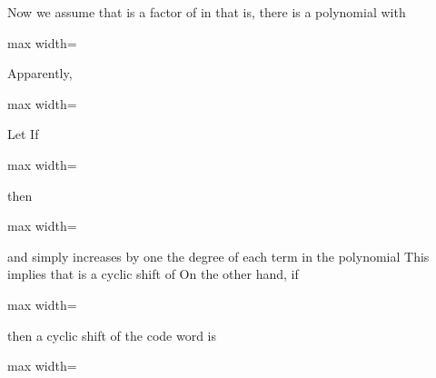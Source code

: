\documentclass[11pt,oneside]{article}
\begin{document}
\begin{BookBody}
Now we assume that  is a factor of  in  that is, there is a polynomial  with

\begin{center}\begin{adjustbox}{max width=\linewidth}\end{adjustbox}\end{center}

\noindent Apparently,

\begin{center}\begin{adjustbox}{max width=\linewidth}\end{adjustbox}\end{center}

\noindent Let  If

\begin{center}\begin{adjustbox}{max width=\linewidth}\end{adjustbox}\end{center}

\noindent then

\begin{center}\begin{adjustbox}{max width=\linewidth}\end{adjustbox}\end{center}

\noindent and  simply increases by one the degree of each term in the polynomial  This implies that  is a cyclic shift of  On the other hand, if

\begin{center}\begin{adjustbox}{max width=\linewidth}\end{adjustbox}\end{center}

\noindent then a cyclic shift of the code word  is

\begin{center}\begin{adjustbox}{max width=\linewidth}\end{adjustbox}\end{center}


\end{BookBody}
\end{document}
